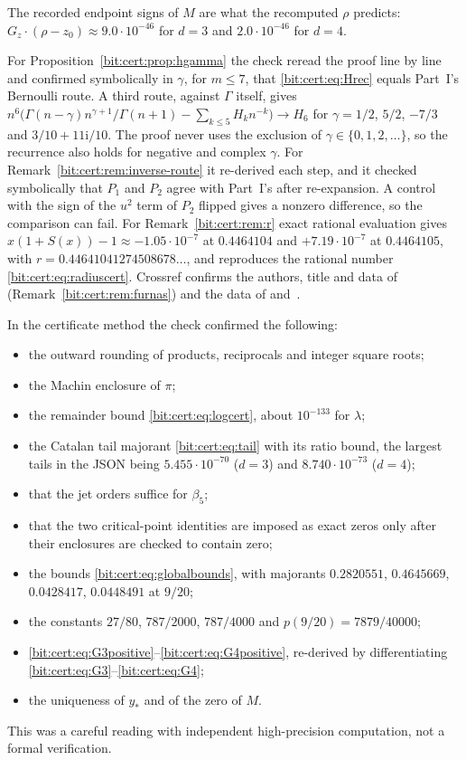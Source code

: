 \documentclass[11pt]{article}
\theoremstyle{definition}\newtheorem{definition}[theorem]{Definition}
\theoremstyle{remark}\newtheorem{remark}[theorem]{Remark}
\begin{document}
The recorded endpoint signs of $M$ are what the recomputed $\rho$ predicts:
$G_z\cdot(\rho-z_0)\approx9.0\cdot10^{-46}$ for $d=3$ and
$2.0\cdot10^{-46}$ for $d=4$.

For Proposition~\ref{bit:cert:prop:hgamma} the check reread the proof line by
line and confirmed symbolically in $\gamma$, for $m\le7$, that
\eqref{bit:cert:eq:Hrec} equals Part~I's Bernoulli route. A third route, against
$\Gamma$ itself, gives
$n^6\bigl(\Gamma(n-\gamma)n^{\gamma+1}/\Gamma(n+1)-\sum_{k\le5}H_kn^{-k}\bigr)\to
H_6$ for $\gamma=1/2$, $5/2$, $-7/3$ and $3/10+11\mathrm i/10$. The proof never
uses the exclusion of $\gamma\in\{0,1,2,\ldots\}$, so the recurrence also holds
for negative and complex $\gamma$. For Remark~\ref{bit:cert:rem:inverse-route}
it re-derived each step, and it checked symbolically that $P_1$ and $P_2$
agree with Part~I's after re-expansion. A control with the sign of the $u^2$
term of $P_2$ flipped gives a nonzero difference, so the comparison can fail.
For Remark~\ref{bit:cert:rem:r} exact rational evaluation gives
$x(1+S(x))-1\approx-1.05\cdot10^{-7}$ at $0.4464104$ and
$+7.19\cdot10^{-7}$ at $0.4464105$, with $r=0.44641041274508678\ldots$, and
reproduces the rational number \eqref{bit:cert:eq:radiuscert}. Crossref
confirms the authors, title and data of \cite{hkq}
(Remark~\ref{bit:cert:rem:furnas}) and the data of \cite{labelle}
and~\cite{kmpr}.

In the certificate method the check confirmed the following:
\begin{itemize}[leftmargin=*,itemsep=0.15em]
\item the outward rounding of products, reciprocals and integer square roots;
\item the Machin enclosure of $\pi$;
\item the remainder bound \eqref{bit:cert:eq:logcert}, about $10^{-133}$ for
 $\lambda$;
\item the Catalan tail majorant \eqref{bit:cert:eq:tail} with its ratio
 bound, the largest tails in the JSON being $5.455\cdot10^{-70}$ ($d=3$) and
 $8.740\cdot10^{-73}$ ($d=4$);
\item that the jet orders suffice for $\beta_5$;
\item that the two critical-point identities are imposed as exact zeros only
 after their enclosures are checked to contain zero;
\item the bounds \eqref{bit:cert:eq:globalbounds}, with majorants
 $0.2820551$, $0.4645669$, $0.0428417$, $0.0448491$ at $9/20$;
\item the constants $27/80$, $787/2000$, $787/4000$ and $p(9/20)=7879/40000$;
\item \eqref{bit:cert:eq:G3positive}--\eqref{bit:cert:eq:G4positive},
 re-derived by differentiating \eqref{bit:cert:eq:G3}--\eqref{bit:cert:eq:G4};
\item the uniqueness of $y_*$ and of the zero of $M$.
\end{itemize}
This was a careful reading with independent high-precision computation, not
a formal verification.
\end{document}
